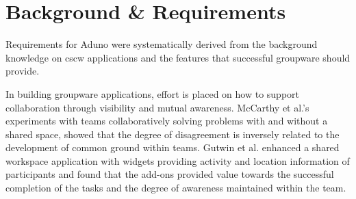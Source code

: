 \documentclass[conference]{IEEEtran}
\begin{document}



\section{Background \& Requirements}
\label{sec:background}

Requirements for Aduno were systematically derived from the background knowledge on {\sc cscw} applications and the features that successful groupware should provide. 

In building groupware applications, effort is placed on how to support collaboration through visibility and mutual awareness. McCarthy et al.'s \cite{MCMM91} experiments with teams collaboratively solving problems with and without a shared space, showed that the degree of disagreement is inversely related to the development of common ground within teams. Gutwin et al. \cite{GRG96} enhanced a shared workspace application with widgets providing activity and location information of participants and found that the add-ons provided value towards the successful completion of the tasks and the degree of awareness maintained within the team.
\end{document}
